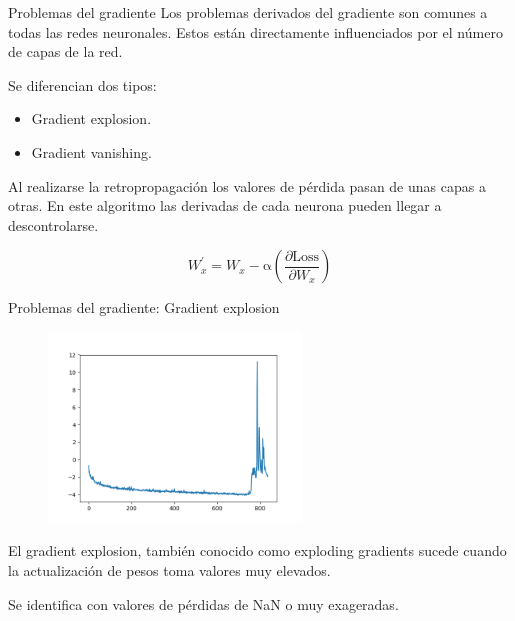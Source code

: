 \begin{frame}{Problemas del gradiente}
Los problemas \alert{derivados del gradiente} son comunes a todas las redes neuronales. Estos están \alert{directamente influenciados} por el número de capas de la red.

Se diferencian dos tipos:
\begin{itemize}
    \item Gradient explosion.
    \item Gradient vanishing.
\end{itemize}

Al realizarse la \alert{retropropagación} los \alert{valores de pérdida} pasan de unas capas a otras. En este algoritmo las derivadas de cada neurona pueden llegar a \alert{descontrolarse}.

\begin{equation}
    W_{x}^{\prime}=W_{x}-\mathrm{\alpha}\left(\frac{\partial \text {Loss}}{\partial W_{x}}\right)
\end{equation}
\end{frame}

\begin{frame}{Problemas del gradiente: Gradient explosion}
\begin{figure}
    \centering
    \includegraphics[width=0.6\textwidth]{figures/Tema 3/GradientExplosion.png}
    \caption{\cite{GradienExplosion}}
\end{figure}

El \alert{gradient explosion}, también conocido como \alert{exploding gradients} sucede cuando la actualización de pesos toma valores \alert{muy elevados}.

Se identifica con valores de pérdidas de \alert{NaN o muy exageradas}.
\end{frame}


